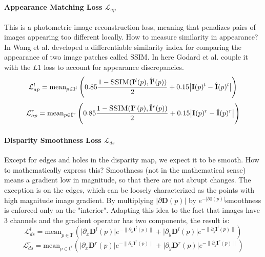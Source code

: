 \paragraph{Appearance Matching Loss $\mathcal{L}_{ap}$} This is a photometric image reconstruction loss, meaning that penalizes pairs of images appearing too different locally.
How to measure similarity in appearance?
In \cite{SSIM} Wang et al. developed a differentiable similarity index for comparing the appearance of two image patches called \textsc{SSIM}.
In here Godard et al. couple it with the $L1$ loss to account for appearance discrepancies.
\[
	\mathcal{L}_{ap}^{l} = \text{mean}_{p \in \mathbf{I}^{l}}
		\left(
			0.85 \frac{
				1 - \textsc{SSIM} (\mathbf{I}^{l}(p), \hat{\mathbf{I}}^{l}(p))
			}{2} +
			0.15 \big| \mathbf{I}(p)^{l} - \hat{\mathbf{I}}(p)^{l} \big|
		\right)
\]\[
	\mathcal{L}_{ap}^{r} = \text{mean}_{p \in \mathbf{I}^{r}}
		\left(
			0.85 \frac{
				1 - \textsc{SSIM} (\mathbf{I}^{r}(p), \hat{\mathbf{I}}^{r}(p))
			}{2} +
			0.15 \big| \mathbf{I}(p)^{r} - \hat{\mathbf{I}}(p)^{r} \big|
		\right)
\]

\paragraph{Disparity Smoothness Loss $\mathcal{L}_{ds}$} Except for edges and holes in the disparity map, we expect it to be smooth.
How to mathematically express this?
Smoothness (not in the mathematical sense) means a gradient low in magnitude, so that there are not abrupt changes.
The exception is on the edges, which can be loosely characterized as the points with high magnitude image gradient.
By multiplying $\big| \partial \mathbf{D}(p) \big|$ by $e^{- \big| \partial \mathbf{I}(p) \big| }$smoothness is enforced only on the "interior".
Adapting this idea to the fact that images have 3 channels and the gradient operator has two components, the result is:
\[
	\mathcal{L}_{ds}^{l} = \text{mean}_{p \in \mathbf{I}^{l}}
		\left(
			\big| \partial_{x} \mathbf{D}^{l}(p) \big| e^{-\big\| \partial_{x} \mathbf{I}^{l}(p) \big\| } + 
			\big| \partial_{y} \mathbf{D}^{l}(p) \big| e^{-\big\| \partial_{y} \mathbf{I}^{l}(p) \big\| }
		\right)
\]\[
	\mathcal{L}_{ds}^{r} = \text{mean}_{p \in \mathbf{I}^{r}}
		\left(
			\big| \partial_{x} \mathbf{D}^{r}(p) \big| e^{-\big\| \partial_{x} \mathbf{I}^{r}(p) \big\| } + 
			\big| \partial_{y} \mathbf{D}^{r}(p) \big| e^{-\big\| \partial_{y} \mathbf{I}^{r}(p) \big\| }
		\right)
\]

